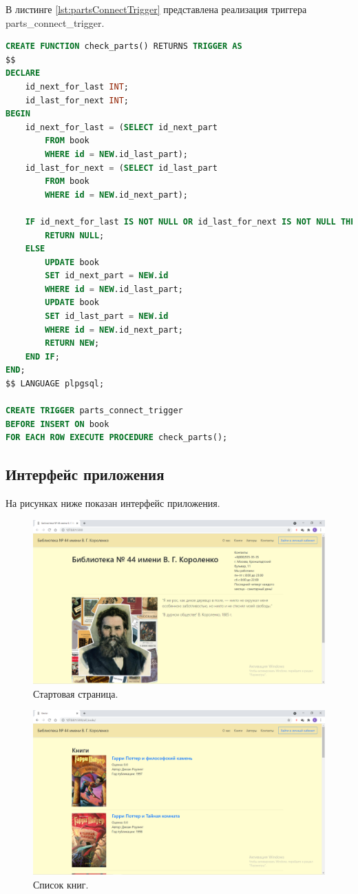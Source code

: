 В листинге \ref{lst:partsConnectTrigger} представлена реализация триггера parts\_connect\_trigger.
\begin{lstlisting}[label={lst:partsConnectTrigger},caption=Реализация триггера parts\_connect\_trigger., language=SQL]
CREATE FUNCTION check_parts() RETURNS TRIGGER AS
$$
DECLARE
	id_next_for_last INT;
	id_last_for_next INT;
BEGIN
	id_next_for_last = (SELECT id_next_part 
		FROM book
		WHERE id = NEW.id_last_part);
	id_last_for_next = (SELECT id_last_part 
		FROM book
		WHERE id = NEW.id_next_part);
	
	IF id_next_for_last IS NOT NULL OR id_last_for_next IS NOT NULL THEN 
		RETURN NULL;
	ELSE
		UPDATE book
		SET id_next_part = NEW.id
		WHERE id = NEW.id_last_part;
		UPDATE book
		SET id_last_part = NEW.id
		WHERE id = NEW.id_next_part;
		RETURN NEW;
	END IF;
END;
$$ LANGUAGE plpgsql;

CREATE TRIGGER parts_connect_trigger
BEFORE INSERT ON book 
FOR EACH ROW EXECUTE PROCEDURE check_parts();
\end{lstlisting}

\subsection{Интерфейс приложения}
На рисунках ниже показан интерфейс приложения.

\begin{figure}[h!]
	\centering
	\includegraphics[scale=0.4]{img/Interface1.png}
	\caption{Стартовая страница.}
\end{figure}

\begin{figure}[h!]
	\centering
	\includegraphics[scale=0.4]{img/Interface2.png}
	\caption{Список книг.}
\end{figure}

